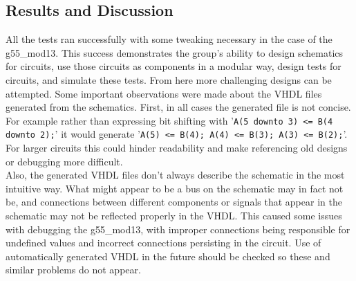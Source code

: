 \documentclass[12pt]{article}
\begin{document}
\subsection{Results and Discussion}
All the tests ran successfully with some tweaking necessary in the case of the g55\_mod13. This success demonstrates the group's ability to design schematics for circuits, use those circuits as components in a modular way, design tests for circuits, and simulate these tests. From here more challenging designs can be attempted. Some important observations were made about the VHDL files generated from the schematics. First, in all cases the generated file is not concise. For example rather than expressing bit shifting with '\texttt{A(5 downto 3) <= B(4 downto 2);}' it would generate '\texttt{A(5) <= B(4); A(4) <= B(3); A(3) <= B(2);}'. For larger circuits this could hinder readability and make referencing old designs or debugging more difficult.\\

Also, the generated VHDL files don't always describe the schematic in the most intuitive way. What might appear to be a bus on the schematic may in fact not be, and connections between different components or signals that appear in the schematic may not be reflected properly in the VHDL. This caused some issues with debugging the g55\_mod13, with improper connections being responsible for undefined values and incorrect connections persisting in the circuit. Use of automatically generated VHDL in the future should be checked so these and similar problems do not appear.
\end{document}
